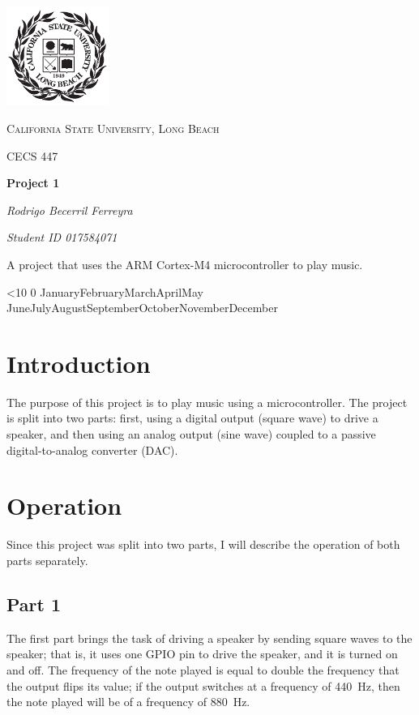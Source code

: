 \documentclass{article}
\renewcommand{\today}{\ifnum\number\day<10 0\fi \number\day \space%
\ifcase \month \or January\or February\or March\or April\or May%
\or June\or July\or August\or September\or October\or November\or December\fi\space%
\number \year}
\begin{document}
\begin{titlepage}
	\centering
	\includegraphics[width=0.25\textwidth]{Images/247px-CSU-Longbeach_seal}\par\vspace{1cm}
	{\scshape\Large California State University, Long Beach \par}
	\vspace{1cm}
	{\scshape\Large CECS 447\par}
	\vspace{1.5cm}
	{\huge\bfseries Project 1\par}
	\vspace{2cm}
    {\Large\itshape Rodrigo Becerril Ferreyra\par}
    {\itshape\Large Student ID 017584071 \par}
	\vfill
    A project that uses the ARM Cortex-M4 microcontroller to
    play music.

	\vfill

	{\large \today\par}
\end{titlepage}

\section{Introduction} The purpose of this project is to play
music using a microcontroller. The project is split into two
parts: first, using a digital output (square wave) to drive
a speaker, and then using an analog output (sine wave) coupled
to a passive digital-to-analog converter (DAC).

\section{Operation}
Since this project was split into two parts, I will describe the
operation of both parts separately.

\subsection{Part 1}
The first part brings the task of driving a speaker by sending
square waves to the speaker; that is, it uses one GPIO pin to
drive the speaker, and it is turned on and off. The frequency of
the note played is equal to double the frequency that the output
flips its value; if the output switches at a frequency of
\SI{440}{\hertz}, then the note played will be of a frequency of
\SI{880}{\hertz}.
\end{document}
